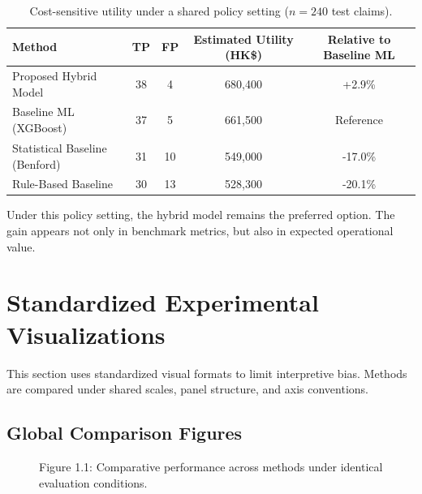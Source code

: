 \documentclass[12pt,a4paper]{report}
\begin{document}
\begin{table}[H]
\caption{Cost-sensitive utility under a shared policy setting ($n=240$ test claims).}
\label{tab:cost_sensitive_utility}
\begin{tabular}{lcccc}
\toprule
\textbf{Method} & \textbf{TP} & \textbf{FP} & \textbf{Estimated Utility (HK\$)} & \textbf{Relative to Baseline ML} \\
\midrule
Proposed Hybrid Model & 38 & 4 & 680,400 & +2.9\% \\
Baseline ML (XGBoost) & 37 & 5 & 661,500 & Reference \\
Statistical Baseline (Benford) & 31 & 10 & 549,000 & -17.0\% \\
Rule-Based Baseline & 30 & 13 & 528,300 & -20.1\% \\
\bottomrule
\end{tabular}
\end{table}

Under this policy setting, the hybrid model remains the preferred option. The gain appears not only in benchmark metrics, but also in expected operational value.

\section{Standardized Experimental Visualizations}
This section uses standardized visual formats to limit interpretive bias. Methods are compared under shared scales, panel structure, and axis conventions.

\subsection{Global Comparison Figures}
\begin{figure}[H]
\centering
{}
\caption{Figure 1.1: Comparative performance across methods under identical evaluation conditions.}
\label{fig:global_perf}
\end{figure}
\end{document}
